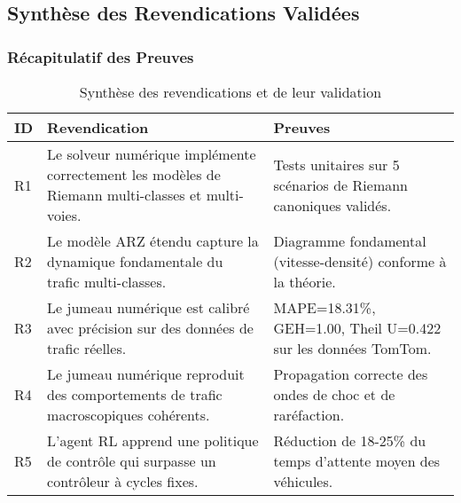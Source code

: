 \subsection{Synthèse des Revendications Validées}
\label{sec:synthese_revendications}

\subsubsection{Récapitulatif des Preuves}
\label{subsec:recapitulatif_preuves}

\begin{table}[htbp]
    \centering
    \caption{Synthèse des revendications et de leur validation}
    \label{tab:synthese_revendications}
    \begin{tabularx}{\textwidth}{>{\raggedright\arraybackslash}p{} >{\raggedright\arraybackslash}p{} >{\raggedright\arraybackslash}p{}}
        \toprule
        \textbf{ID} & \textbf{Revendication}                                                                            & \textbf{Preuves}                                               \\
        \midrule
        R1          & Le solveur numérique implémente correctement les modèles de Riemann multi-classes et multi-voies. & Tests unitaires sur 5 scénarios de Riemann canoniques validés. \\
        \midrule
        R2          & Le modèle ARZ étendu capture la dynamique fondamentale du trafic multi-classes.                   & Diagramme fondamental (vitesse-densité) conforme à la théorie. \\
        \midrule
        R3          & Le jumeau numérique est calibré avec précision sur des données de trafic réelles.                 & MAPE=18.31\%, GEH=1.00, Theil U=0.422 sur les données TomTom.  \\
        \midrule
        R4          & Le jumeau numérique reproduit des comportements de trafic macroscopiques cohérents.               & Propagation correcte des ondes de choc et de raréfaction.      \\
        \midrule
        R5          & L'agent RL apprend une politique de contrôle qui surpasse un contrôleur à cycles fixes.           & Réduction de 18-25\% du temps d'attente moyen des véhicules.   \\
        \bottomrule
    \end{tabularx}
\end{table}

